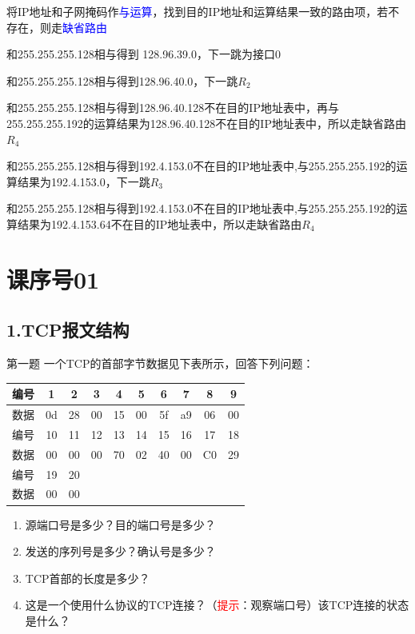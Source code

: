 \documentclass[handout]{beamer}
\begin{document}
\begin{frame}
	\begin{block}{}
	将IP地址和子网掩码作\textcolor{blue}{与运算}，找到目的IP地址和运算结果一致的路由项，若不存在，则走\textcolor{blue}{缺省路由}
	\end{block}
	\begin{description}
		\item<2->[128.96.39.10] 和255.255.255.128相与得到	128.96.39.0，下一跳为接口$0$
		\item<3->[128.96.40.12] 和255.255.255.128相与得到128.96.40.0，下一跳$R_2$
		\item<4->[128.96.40.151]和255.255.255.128相与得到128.96.40.128不在目的IP地址表中，再与255.255.255.192的运算结果为128.96.40.128不在目的IP地址表中，所以走缺省路由$R_4$
		\item<5->[192.4.153.17]和255.255.255.128相与得到192.4.153.0不在目的IP地址表中,与255.255.255.192的运算结果为192.4.153.0，下一跳$R_3$
		\item<6->[192.4.153.90]和255.255.255.128相与得到192.4.153.0不在目的IP地址表中,与255.255.255.192的运算结果为192.4.153.64不在目的IP地址表中，所以走缺省路由$R_4$
	\end{description}
\end{frame}

\section{课序号01}
\subsection{1.TCP报文结构}
\begin{frame}{第一题}
	一个TCP的首部字节数据见下表所示，回答下列问题：
	\begin{table}
		\begin{tabular}{|c|c|c|c|c|c|c|c|c|c|}
			\hline
			编号&	1& 	2&	3&	4&	5& 6&	7&	8&	9\\
			\hline
			数据&	0d&	28&	00&	15&	00&	5f&	a9&	06&	00\\
			\hline
			编号&	10&	11&	12&	13&	14&	15&	16&	17&	18\\
			\hline
			数据&	00&	00&	00&	70&	02&	40&	00&	C0&	29\\
			\hline
			编号&	19&	20& & & & & & & \\ 	
			\hline						
			数据&	00&	00&	& &　& & & & \\	
			\hline						
		\end{tabular}
	\end{table}
	\begin{enumerate}
		\item 源端口号是多少？目的端口号是多少？
		\item 发送的序列号是多少？确认号是多少？
		\item TCP首部的长度是多少？
		\item 这是一个使用什么协议的TCP连接？（\textcolor{red}{提示}：观察端口号）该TCP连接的状态是什么？	
	\end{enumerate}
\end{frame}
\end{document}

